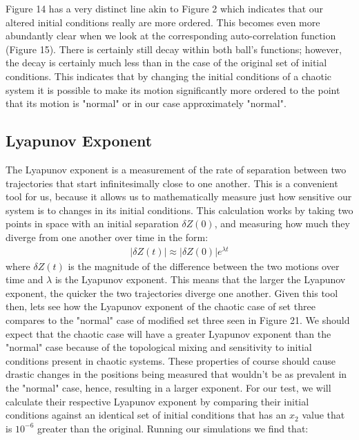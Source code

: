 \documentclass[twocolumn]{article}
\begin{document}
Figure 14 has a very distinct line akin to Figure 2 which indicates that our altered initial conditions really are more ordered. This becomes even more abundantly clear when we look at the corresponding auto-correlation function (Figure 15). There is certainly still decay within both ball's functions; however, the decay is certainly much less than in the case of the original set of initial conditions. This indicates that by changing the initial conditions of a chaotic system it is possible to make its motion significantly more ordered to the point that its motion is "normal" or in our case approximately "normal". 
\subsection{Lyapunov Exponent}
\hspace{\parindent}The Lyapunov exponent is a measurement of the rate of separation between two trajectories that start infinitesimally close to one another. This is a convenient tool for us, because it allows us to mathematically measure just how sensitive our system is to changes in its initial conditions. This calculation works by taking two points in space with an initial separation $\delta{Z}(0)$, and measuring how much they diverge from one another over time in the form:
\begin{align}
	\left|\delta Z(t)\right| \approx \left|\delta Z(0)\right| e^{\lambda t}
\end{align}
where $\delta Z(t)$ is the magnitude of the difference between the two motions over time and $\lambda$ is the Lyapunov exponent. This means that the larger the Lyapunov exponent, the quicker the two trajectories diverge one another. Given this tool then, lets see how the Lyapunov exponent of the chaotic case of set three compares to the "normal" case of modified set three seen in Figure 21. We should expect that the chaotic case will have a greater Lyapunov exponent than the "normal" case because of the topological mixing and sensitivity to initial conditions present in chaotic systems. These properties of course should cause drastic changes in the positions being measured that wouldn't be as prevalent in the "normal" case, hence, resulting in a larger exponent. For our test, we will calculate their respective Lyapunov exponent by comparing their initial conditions against an identical set of initial conditions that has an $x_2$ value that is $10^{-6}$ greater than the original. Running our simulations we find that: \\
\end{document}
